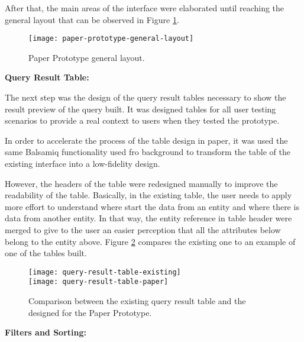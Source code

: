 After that, the main areas of the interface were elaborated until reaching the general layout that can be observed in Figure \ref{fig:paperPrototypeGeneralLayout}.

\begin{figure}[htbp]
	\centering
	\texttt{[image: paper-prototype-general-layout]}
	\caption{Paper Prototype general layout.}
	\label{fig:paperPrototypeGeneralLayout}
\end{figure}

\medskip

\textbf{Query Result Table:}

\medskip

The next step was the design of the query result tables necessary to show the result preview of the query built. It was designed tables for all user testing scenarios to provide a real context to users when they tested the prototype. 

In order to accelerate the process of the table design in paper, it was used the same Balsamiq functionality used fro background to transform the table of the existing interface into a low-fidelity design. 

However, the headers of the table were redesigned manually to improve the readability of the table. Basically, in the existing table, the user needs to apply more effort to understand where start the data from an entity and where there is data from another entity. In that way, the entity reference in table header were merged to give to the user an easier perception that all the attributes below belong to the entity above. Figure \ref{fig:queryResultTableComparison} compares the existing one to an example of one of the tables built.

\begin{figure}[tb]
  \centering
    {\texttt{[image: query-result-table-existing]}}%
    \\
  {\texttt{[image: query-result-table-paper]}}%
\caption{Comparison between the existing query result table and the designed for the Paper Prototype.}
  \label{fig:queryResultTableComparison}
\end{figure}

\medskip

\textbf{Filters and Sorting: }

\medskip

